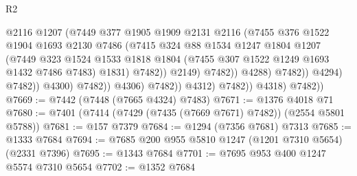 \begin{lexlean}{R2}
\begin{coremodule}
                                            @2116
                                            @1207
                                            (@7449
                                              @377
                                              @1905
                                              @1909
                                              @2131
                                              @2116
                                              (@7455
                                                @376
                                                @1522
                                                @1904
                                                @1693
                                                @2130
                                                @7486
                                                (@7415
                                                  @324
                                                  @88
                                                  @1534
                                                  @1247
                                                  @1804
                                                  @1207
                                                  (@7449
                                                    @323
                                                    @1524
                                                    @1533
                                                    @1818
                                                    @1804
                                                    (@7455 @307 @1522 @1249 @1693 @1432 @7486 @7483)
                                                    @1831)
                                                  @7482))
                                              @2149)
                                            @7482))
                                        @4288)
                                      @7482))
                                  @4294)
                                @7482))
                            @4300)
                          @7482))
                      @4306)
                    @7482))
                @4312)
              @7482))
          @4318)
        @7482))
@7669 := @7442 (@7448 (@7665 @4324) @7483)
@7671 := @1376 @4018 @71
@7680 := @7401 (@7414 (@7429 (@7435 (@7669 @7671) @7482)) (@2554 @5801 @5788))
@7681 := @157 @7379
@7684 := @1294 (@7356 @7681) @7313
@7685 := @1333 @7684
@7694 := @7685 @200 @955 @5810 @1247 (@1201 @7310 @5654) (@2331 @7396)
@7695 := @1343 @7684
@7701 := @7695 @953 @400 @1247 @5574 @7310 @5654
@7702 := @1352 @7684

\end{coremodule}
\end{lexlean}
